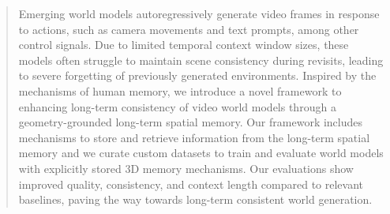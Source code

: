 \begin{abstract}
Emerging world models autoregressively generate video frames in response to actions, such as camera movements and text prompts, among other control signals. 
%
Due to limited temporal context window sizes, these models often struggle to maintain scene consistency during revisits, leading to severe forgetting of previously generated environments. 
%
Inspired by the mechanisms of human memory, we introduce a novel framework to enhancing long-term consistency of video world models through a geometry-grounded long-term spatial memory.
%
Our framework includes mechanisms to store and retrieve information from the long-term spatial memory and we curate custom datasets to train and evaluate world models with explicitly stored 3D memory mechanisms.
%
Our evaluations show improved quality, consistency, and context length compared to relevant baselines, paving the way towards long-term consistent world generation.
\end{abstract}

